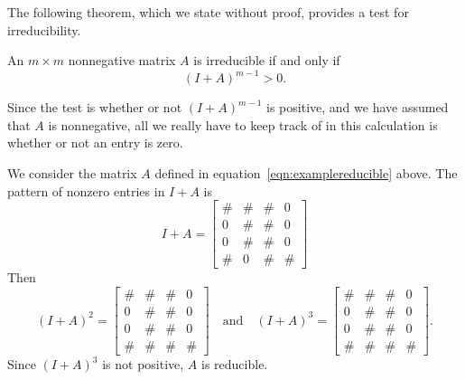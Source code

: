 The following theorem, which we state without proof, provides
a test for irreducibility.
\begin{theorem}
An $m\times m$ nonnegative matrix $A$ is 
irreducible if and only if
\begin{equation}
   (I+A)^{m-1} > 0.
\end{equation}
\end{theorem}
Since the test is whether or not $(I+A)^{m-1}$ is positive, and we have assumed that
$A$ is nonnegative, all we really have to keep track of in this calculation is
whether or not an entry is zero.
\begin{xexample}
We consider the matrix $A$ defined in equation~\eqref{eqn:examplereducible}
above.  The pattern of nonzero entries in $I+A$ is
\begin{equation}
  I+A = \begin{bmatrix}
            \# & \# & \# & 0 \\
            0  & \# & \# & 0 \\
            0 & \# & \# & 0 \\
            \# & 0 & \# & \#
      \end{bmatrix}
\end{equation}
Then
\begin{equation}
  (I+A)^2 = 
      \begin{bmatrix}
            \# & \# & \# & 0 \\
            0  & \# & \# & 0 \\
            0 & \# & \# & 0 \\
            \# & \# & \# & \#
      \end{bmatrix}
    \quad \textrm{and} \quad
  (I+A)^3 = 
      \begin{bmatrix}
            \# & \# & \# & 0 \\
            0  & \# & \# & 0 \\
            0 & \# & \# & 0 \\
            \# & \# & \# & \#
      \end{bmatrix}.
\end{equation}
Since $(I+A)^3$ is not positive, $A$ is reducible.


\end{xexample}
